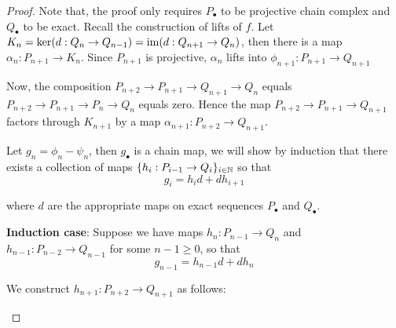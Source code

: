\begin{proof} 
	
	Note that, the proof only requires $P_\bullet$ to be projective chain complex and $Q_\bullet$ to be exact. Recall the construction of lifts of $f$. Let $K_n = \ker (d: Q_n \to Q_{n-1}) = \operatorname{im} (d: Q_{n+1} \to Q_n)$, then there is a map $\alpha_n: P_{n+1} \to K_n$. Since $P_{n+1}$ is projective, $\alpha_n$ lifts into $\phi_{n+1}: P_{n+1} \to Q_{n+1}$
	
	\begin{center}
	\end{center}
	
	Now, the composition $P_{n+2} \to P_{n+1} \to Q_{n+1} \to Q_{n}$ equals $P_{n+2} \to P_{n+1} \to P_n \to Q_{n}$ equals zero. Hence the map $P_{n+2} \to P_{n+1} \to Q_{n+1}$ factors through $K_{n+1}$ by a map $\alpha_{n+1}: P_{n+2} \to Q_{n+1}$.
	
	Let $g_n = \phi_n - \psi_n$, then $g_\bullet$ is a chain map, we will show by induction that there exists a collection of maps $\{h_i: P_{i-1} \to Q_i\}_{i \in \mathbb{N}}$ so that
	$$
		g_i = h_i d + d h_{i+1}
	$$
	
	where $d$ are the appropriate maps on exact sequences $P_\bullet$ and $Q_\bullet$. 
	
	\textbf{Induction case}: Suppose we have maps $h_n: P_{n-1} \to Q_n$ and $h_{n-1}: P_{n-2} \to Q_{n-1}$ for some $n -1 \geq 0$, so that
	$$
		g_{n-1} = h_{n-1} d + d h_n
	$$
	
	We construct $h_{n+1}: P_{n+2} \to Q_{n+1}$ as follows: 
	\begin{center}
	\end{center}
	

\end{proof}
